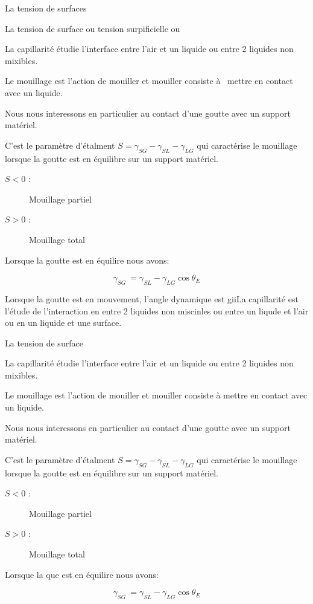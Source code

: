 La tension de surfaces

La tension de surface ou tension surpificielle ou

La capillarité étudie l'interface entre l'air et un liquide ou entre 2 liquides
non mixibles.

Le mouillage est l'action de mouiller et mouiller consiste à  mettre en contact avec un liquide.

Nous nous interessons en particulier au contact d'une goutte avec un support matériel.

C'est le paramètre d'étalment $S = \gamma_{SG} - \gamma_{SL} - \gamma_{LG}$ qui caractérise le mouillage lorsque la goutte est en équilibre sur un support matériel.

\begin{description}
\item[$S < 0$ :] Mouillage partiel
\item[$S > 0$ :] Mouillage total
\end{description}

Lorsque la goutte est en équilire nous avons:

\[\gamma_{SG}\ = \gamma_{SL} - \gamma_{LG}\cos\theta_{E}\]

Lorsque la goutte est en mouvement, l'angle dynamique  est giiLa capillarité est l'étude de l'interaction en entre 2 liquides non miscinles ou entre un liqude et l'air ou en un liquide et une surface.

La tension de surface 

La capillarité étudie l'interface entre l'air et un liquide ou entre 2 liquides
non mixibles.

Le mouillage est l'action de mouiller et mouiller consiste à mettre en contact avec un liquide.

Nous nous interessons en particulier au contact d'une goutte avec un support matériel.

C'est le paramètre d'étalment $S = \gamma_{SG} - \gamma_{SL} - \gamma_{LG}$ qui caractérise le mouillage lorsque la goutte est en équilibre sur un support matériel.

\begin{description}
\item[$S < 0$ :] Mouillage partiel
\item[$S > 0$ :] Mouillage total
\end{description}

Lorsque la que est en équilire nous avons:

\[\gamma_{SG}\ = \gamma_{SL} - \gamma_{LG}\cos\theta_{E} \]

